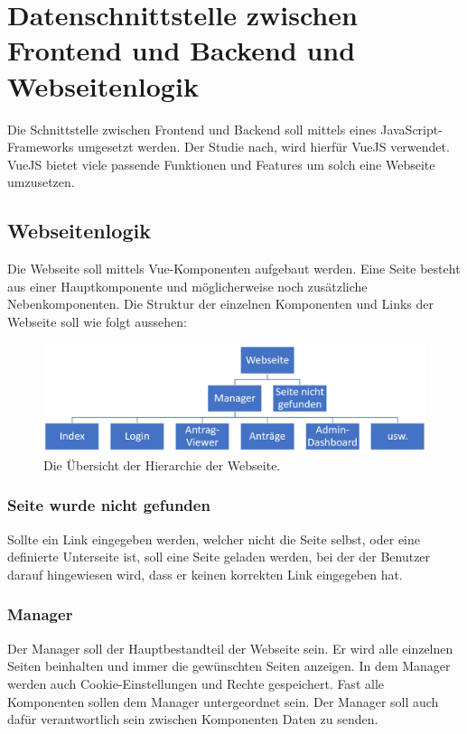 \section{Datenschnittstelle zwischen Frontend und Backend und Webseitenlogik}
Die Schnittstelle zwischen Frontend und Backend soll mittels eines JavaScript-Frameworks umgesetzt werden. Der Studie nach, wird hierfür VueJS verwendet. VueJS bietet viele passende Funktionen und Features um solch eine Webseite umzusetzen.
\subsection{Webseitenlogik}
Die Webseite soll mittels Vue-Komponenten aufgebaut werden. Eine Seite besteht aus einer Hauptkomponente und möglicherweise noch zusätzliche Nebenkomponenten. Die Struktur der einzelnen Komponenten und Links der Webseite soll wie folgt aussehen:
\begin{figure}[H]
	\centering
	\includegraphics[width=0.8\linewidth]{images/Webseite_hierarchie}
	\caption[Die Hierarchie der Webseite]{Die Übersicht der Hierarchie der Webseite.}
	\label{fig:webseitehierachie}
\end{figure}

\subsubsection{Seite wurde nicht gefunden}
Sollte ein Link eingegeben werden, welcher nicht die Seite selbst, oder eine definierte Unterseite ist, soll eine Seite geladen werden, bei der der Benutzer darauf hingewiesen wird, dass er keinen korrekten Link eingegeben hat.
\subsubsection{Manager}
Der Manager soll der Hauptbestandteil der Webseite sein. Er wird alle einzelnen Seiten beinhalten und immer die gewünschten Seiten anzeigen. In dem Manager werden auch Cookie-Einstellungen und Rechte gespeichert. Fast alle Komponenten sollen dem Manager untergeordnet sein. Der Manager soll auch dafür verantwortlich sein zwischen Komponenten Daten zu senden.

